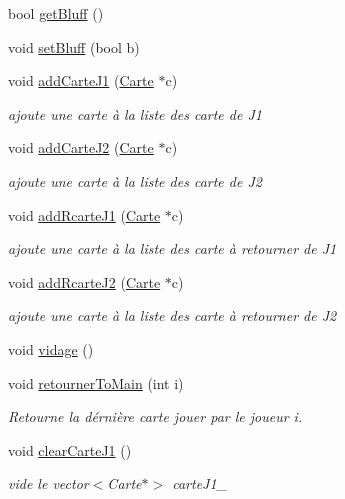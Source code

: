 \begin{DoxyCompactItemize}
\item 
bool \hyperlink{class_jeu_af8a568254fd6935e8814f31580300f0e}{get\-Bluff} ()
\item 
void \hyperlink{class_jeu_ac3e1701f943f16436a15e423bd2c6e62}{set\-Bluff} (bool b)
\item 
void \hyperlink{class_jeu_aacd7585f3235e9e0da4bcbfc6eef5ba9}{add\-Carte\-J1} (\hyperlink{class_carte}{Carte} $\ast$c)
\begin{DoxyCompactList}\small\item\em ajoute une carte à la liste des carte de J1 \end{DoxyCompactList}\item 
void \hyperlink{class_jeu_ab723c1aa7efb0961d83a53862ebd5122}{add\-Carte\-J2} (\hyperlink{class_carte}{Carte} $\ast$c)
\begin{DoxyCompactList}\small\item\em ajoute une carte à la liste des carte de J2 \end{DoxyCompactList}\item 
void \hyperlink{class_jeu_a6e61d83c15d2bd2bb0068dc58c4248f0}{add\-Rcarte\-J1} (\hyperlink{class_carte}{Carte} $\ast$c)
\begin{DoxyCompactList}\small\item\em ajoute une carte à la liste des carte à retourner de J1 \end{DoxyCompactList}\item 
void \hyperlink{class_jeu_adae51a9577a485942e3d349fa43be0f4}{add\-Rcarte\-J2} (\hyperlink{class_carte}{Carte} $\ast$c)
\begin{DoxyCompactList}\small\item\em ajoute une carte à la liste des carte à retourner de J2 \end{DoxyCompactList}\item 
void \hyperlink{class_jeu_aa5e5d255f55ff79dc50a149840240219}{vidage} ()
\item 
void \hyperlink{class_jeu_abd1b3f4f3866299296c37d5def7bd509}{retourner\-To\-Main} (int i)
\begin{DoxyCompactList}\small\item\em Retourne la dérnière carte jouer par le joueur i. \end{DoxyCompactList}\item 
void \hyperlink{class_jeu_af710d22785038c25866e270821a0d164}{clear\-Carte\-J1} ()
\begin{DoxyCompactList}\small\item\em vide le vector$<$\-Carte$\ast$$>$ carte\-J1\-\_\- \end{DoxyCompactList}\item 

\end{DoxyCompactItemize}
